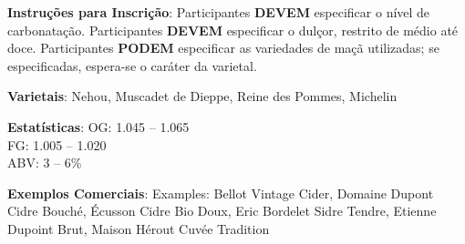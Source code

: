 \textbf{Instruções para Inscrição}: Participantes \textbf{DEVEM} especificar o nível de carbonatação. Participantes \textbf{DEVEM} especificar o dulçor, restrito de médio até doce. Participantes \textbf{PODEM} especificar as variedades de maçã utilizadas; se especificadas, espera-se o caráter da varietal.

\textbf{Varietais}: Nehou, Muscadet de Dieppe, Reine des Pommes, Michelin

\textbf{Estatísticas}: OG: 1.045 – 1.065 \\
\phantom{ } \hspace{16.5mm} FG: 1.005 – 1.020 \\
\phantom{ } \hspace{16.5mm} ABV: 3 – 6\%

\textbf{Exemplos Comerciais}: Examples: Bellot Vintage Cider, Domaine Dupont Cidre Bouché, Écusson Cidre Bio Doux, Eric Bordelet Sidre Tendre, Etienne Dupoint Brut, Maison Hérout Cuvée Tradition
